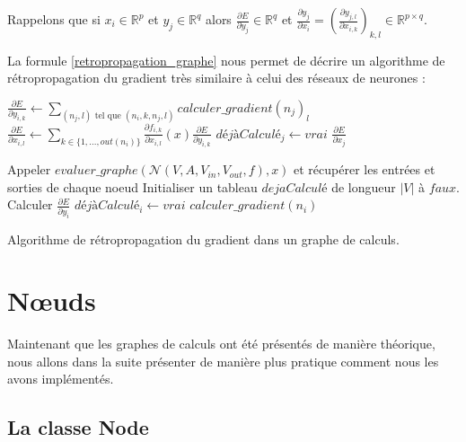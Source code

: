 Rappelons que si $x_i \in \mathbb{R}^p$ et $y_j \in \mathbb{R}^q$ alors $\frac{\partial E}{\partial y_j} \in \mathbb{R}^q$ et $\frac{\partial y_j}{\partial x_i} = (\frac{\partial y_{j,l}}{\partial x_{i, k}})_{k, l} \in \mathbb{R}^{p \times q}$.

La formule \ref{retropropagation_graphe} nous permet de décrire un algorithme de rétropropagation du gradient très similaire à celui des réseaux de neurones :

\begin{algorithm} 
\begin{algorithmic}
			\State $\frac{\partial E}{\partial y_{i, k}} \leftarrow \sum_{(n_j, l)\text{ tel que }(n_i, k, n_j, l)}{calculer\_gradient(n_j)_l}$
		\EndFor
			\State $\frac{\partial E}{\partial x_{i, l}} \leftarrow \sum_{k \in \{1, ..., out(n_i) \}}{\frac{\partial f_{i, k}}{\partial x_{i, l}}(x)\frac{\partial E}{\partial y_{i, k}}}$
		\EndFor
		\State $déjàCalculé_j \leftarrow vrai$
	\EndIf
	\State \Return $\frac{\partial E}{\partial x_j}$
\EndFunction

\State Appeler $evaluer\_graphe(\mathcal{N}(V, A, V_{in}, V_{out}, f), x)$ et récupérer les entrées et sorties de chaque noeud
\State Initialiser un tableau $dejaCalculé$ de longueur $|V|$ à $faux$.
	\State Calculer $\frac{\partial E}{\partial y_i}$
	\State $déjàCalculé_i \leftarrow vrai$ 
\EndFor
{}
	\State $calculer\_gradient(n_i)$ 
\EndFor
\EndProcedure
\end{algorithmic} 
\caption{Algorithme de rétropropagation du gradient dans un graphe de calculs.}
\label{propagation_memoisation2}
\end{algorithm}

\section{N\oe{}uds}

Maintenant que les graphes de calculs ont été présentés de manière théorique, nous allons dans la suite présenter de manière plus pratique comment nous les avons implémentés.

\subsection{La classe Node}

